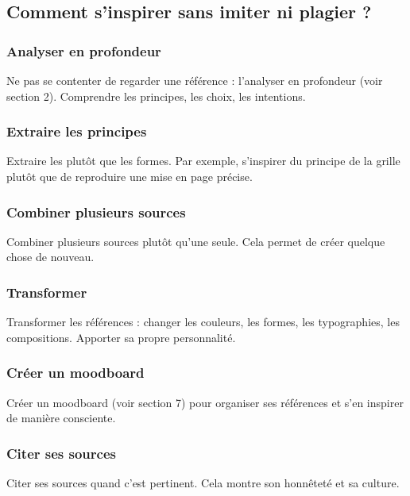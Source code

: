 \subsection{Comment s'inspirer sans imiter ni plagier ?}

\subsubsection{Analyser en profondeur}

Ne pas se contenter de regarder une référence : l'analyser en profondeur (voir section 2). Comprendre les principes, les choix, les intentions.

\subsubsection{Extraire les principes}

Extraire les  plutôt que les formes. Par exemple, s'inspirer du principe de la grille plutôt que de reproduire une mise en page précise.

\subsubsection{Combiner plusieurs sources}

Combiner plusieurs sources plutôt qu'une seule. Cela permet de créer quelque chose de nouveau.

\subsubsection{Transformer}

Transformer les références : changer les couleurs, les formes, les typographies, les compositions. Apporter sa propre personnalité.

\subsubsection{Créer un moodboard}

Créer un moodboard (voir section 7) pour organiser ses références et s'en inspirer de manière consciente.

\subsubsection{Citer ses sources}

Citer ses sources quand c'est pertinent. Cela montre son honnêteté et sa culture.

